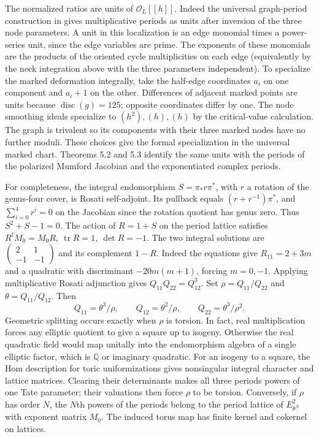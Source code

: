 \documentclass[11pt]{article}
\newcommand{\Q}{\mathbb Q}
\begin{document}
The normalized ratios are units of $\mathcal O_L[[h]]$. Indeed the
universal graph-period construction in \cite[Thms.~4.3, 5.1--5.3]{Ich}
gives multiplicative periods as units after inversion of the three node
parameters. A unit in this localization is an edge monomial times a
power-series unit, since the edge variables are prime. The exponents of
these monomials are the products of the oriented cycle multiplicities on
each edge (equivalently by the neck integration above with the three
parameters independent). To specialize the marked deformation integrally,
take the half-edge coordinates $a_i$ on one component and $a_i+1$ on
the other. Differences of adjacent marked points are units because
$\operatorname{disc}(g)=125$; opposite coordinates differ by one. The
node smoothing ideals specialize to $(h^2),(h),(h)$ by the critical-value
calculation. The graph is trivalent so its components with their three
marked nodes have no further moduli. These choices give the formal
specialization in the universal marked chart. Theorems 5.2 and 5.3
identify the same units with the periods of the polarized Mumford
Jacobian and the exponentiated complex periods.

For completeness, the integral endomorphism $S=\pi_*r\pi^*$, with $r$
a rotation of the genus-four cover, is Rosati self-adjoint. Its pullback
equals $(r+r^{-1})\pi^*$, and $\sum_{i=0}^4r^i=0$ on the Jacobian
since the rotation quotient has genus zero. Thus $S^2+S-1=0$. The
action of $R=1+S$ on the period lattice satisfies
$R^tM_0=M_0R,\ \operatorname{tr}R=1,\ \det R=-1$. The two integral
solutions are
$\left(\begin{smallmatrix}2&1\\-1&-1\end{smallmatrix}\right)$ and its
complement $1-R$. Indeed the equations give $R_{11}=2+3m$ and a
quadratic with discriminant $-20m(m+1)$, forcing $m=0,-1$.
Applying multiplicative Rosati adjunction
\cite[Prop.~3.8]{PR} gives $Q_{11}Q_{22}=Q_{12}^3$. Set
$\rho=Q_{11}/Q_{22}$ and $\theta=Q_{11}/Q_{12}$. Then
\[
 Q_{11}=\theta^3/\rho,\qquad Q_{12}=\theta^2/\rho,\qquad
 Q_{22}=\theta^3/\rho^2 .
\]
Geometric splitting occurs exactly when $\rho$ is torsion. In fact,
real multiplication forces any elliptic quotient to give a square up
to isogeny. Otherwise the real quadratic field would map unitally into
the endomorphism algebra of a single elliptic factor, which is $\Q$ or
imaginary quadratic. For an isogeny to a square, the Hom description for
toric uniformizations \cite[\S3.7]{PR} gives nonsingular integral
character and lattice matrices. Clearing their determinants makes all
three periods powers of one Tate parameter; their valuations then force
$\rho$ to be torsion. Conversely, if $\rho$ has order $N$, the $N$th
powers of the periods belong to the period lattice of
$E_{\theta^N}^2$ with exponent matrix $M_0$. The induced torus map
has finite kernel and cokernel on lattices.
\end{document}
